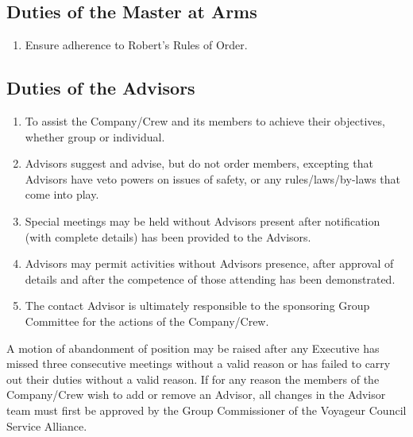 \subsection{Duties of the Master at Arms}\label{subsec:duties-of-the-master-at-arms}
\begin{enumerate}
    \item Ensure adherence to Robert's Rules of Order.
\end{enumerate}

\subsection{Duties of the Advisors}\label{subsec:duties-of-the-advisors}
\begin{enumerate}
    \item To assist the Company/Crew and its members to achieve their objectives, whether group or individual.
    \item Advisors suggest and advise, but do not order members, excepting that Advisors have veto powers on issues of safety, or any rules/laws/by-laws that come into play.
    \item Special meetings may be held without Advisors present after notification (with complete details) has been provided to the Advisors.
    \item Advisors may permit activities without Advisors presence, after approval of details and after the competence of those attending has been demonstrated.
    \item The contact Advisor is ultimately responsible to the sponsoring Group Committee for the actions of the Company/Crew.
\end{enumerate}
A motion of abandonment of position may be raised after any Executive has missed three consecutive meetings without a valid reason or has failed to carry out their duties without a valid reason.
If for any reason the members of the Company/Crew wish to add or remove an Advisor, all changes in the Advisor team must first be approved by the Group Commissioner of the Voyageur Council Service Alliance.